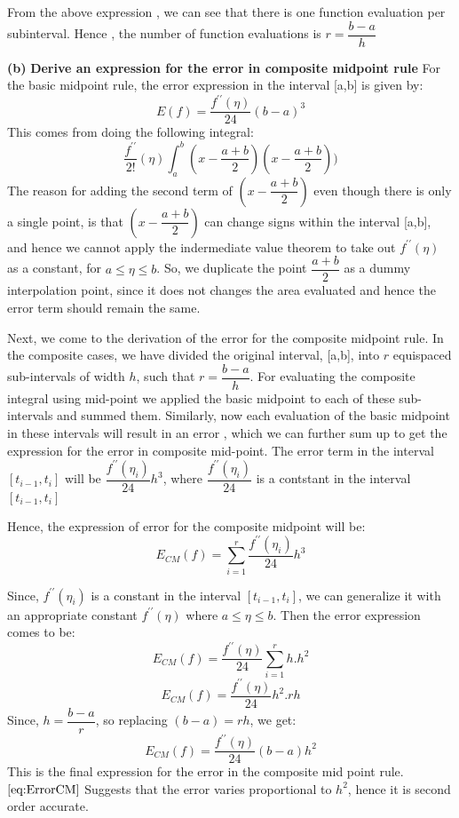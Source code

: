 \documentclass{article}
\renewcommand\part[1]{\vspace{.10in}\textbf{(#1)}}
\begin{document}
  From the above expression , we can see that there is one function evaluation per subinterval. Hence , the number of function evaluations is $r = \dfrac{b-a}{h}$ \newline

  \part{b} \textbf {Derive an expression for the error in composite midpoint rule} \newline
  For the basic midpoint rule, the error expression in the interval [a,b] is given by:
  \[E(f) = \dfrac{f^{\prime\prime}(\eta)}{24}(b-a)^3\]
  This comes from doing the following integral:
  \[\dfrac{f^{\prime\prime}}{2!}(\eta)\int_{a}^{b}(x - \dfrac{a+b}{2})(x - \dfrac{a+b}{2})) \]
  The reason for adding the second term of $(x - \dfrac{a+b}{2})$ even though there is only a single point, is that $(x - \dfrac{a+b}{2})$ can change signs within the interval [a,b], and hence we cannot apply the indermediate value theorem to take out $f^{\prime\prime}(\eta)$ as a constant, for $a \leq \eta \leq b$. So, we duplicate the point $\dfrac{a+b}{2}$ as a dummy interpolation point, since it does not changes the area evaluated and hence the error term should remain the same. \newline

  Next, we come to the derivation of the error for the composite midpoint rule. In the composite cases, we have divided the original interval, [a,b], into $r$ equispaced sub-intervals of width $h$, such that $r = \dfrac{b-a}{h}$. For evaluating the composite integral using mid-point we applied the basic midpoint to each of these sub-intervals and summed them. Similarly, now each evaluation of the basic midpoint in these intervals will result in an error , which we can further sum up to get the expression for the error in composite mid-point. The error term in the interval $[t_{i-1},t_i]$ will be $\dfrac{f^{\prime\prime}(\eta_i)}{24}h^3$, where $\dfrac{f^{\prime\prime}(\eta_i)}{24}$ is a contstant in the interval $[t_{i-1},t_i]$
  

  Hence, the expression of error for the composite midpoint will be:
  \[E_{CM}(f) = \sum_{i=1}^r \dfrac{f^{\prime\prime}(\eta_i)}{24}h^3\]

  Since, $f^{\prime\prime}(\eta_i)$ is a constant in the interval $[t_{i-1},t_i]$, we can generalize it with an appropriate constant $f^{\prime\prime}(\eta)$ where $a \leq \eta \leq b$. Then the error expression comes to be:
  \[ E_{CM}(f) = \dfrac{f^{\prime\prime}(\eta)}{24} \sum_{i=1}^{r} h.h^2\]
  \[ E_{CM}(f) = \dfrac{f^{\prime\prime}(\eta)}{24} h^2.rh\]
  Since, $h = \dfrac{b-a}{r}$, so replacing $(b-a) = rh$, we get:
  \begin{equation}
   E_{CM}(f) = \dfrac{f^{\prime\prime}(\eta)}{24}(b-a)h^2
   \label{eq:ErrorCM}
  \end{equation}
  This is the final expression for the error in the composite mid point rule. \newline
  $\eqref{eq:ErrorCM}$ Suggests that the error varies proportional to $h^2$, hence it is second order accurate. 
\end{document}
